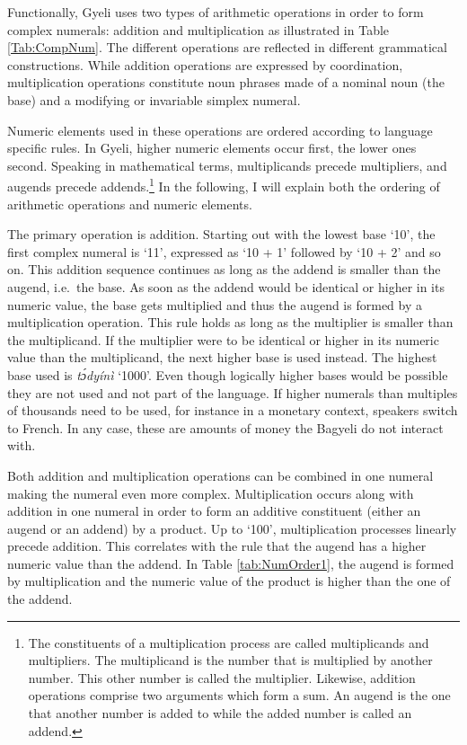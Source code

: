 Functionally, Gyeli uses two types of arithmetic operations in order to form complex numerals: addition and multiplication as illustrated in Table \ref{Tab:CompNum}. The different operations are reflected in different grammatical constructions. While addition operations are expressed by coordination, multiplication operations constitute noun phrases made of a nominal noun (the base) and a modifying or invariable simplex numeral.

Numeric elements used in these operations are ordered according to language specific rules. In Gyeli, higher numeric elements occur first, the lower ones second. Speaking in mathematical terms, multiplicands precede multipliers, and augends precede addends.\footnote{The constituents of a multiplication process are called multiplicands and multipliers. The multiplicand is the number that is multiplied by another number. This other number is called the multiplier. Likewise, addition operations comprise two arguments which form a sum. An augend is the one that another number is added to while the added number is called an addend.} In the following, I will explain both the ordering of arithmetic operations and numeric elements.

The primary operation is addition. Starting out with the lowest base `10', the first complex numeral is `11', expressed as `10 + 1' followed by `10 + 2' and so on. This addition sequence continues as long as the addend is smaller than the augend, i.e.~the base. As soon as the addend would be identical or higher in its numeric value, the base gets multiplied and thus the augend is formed by a multiplication operation. This rule holds as long as the multiplier is smaller than the multiplicand. If the multiplier were to be identical or higher in its numeric value than the multiplicand, the next higher base is used instead. The highest base used is {\itshape tɔ́dyínì} `1000'. Even though logically higher bases would be possible they are not used and not part of the language. If higher numerals than multiples of thousands need to be used, for instance in a monetary context, speakers switch to French. In any case, these are amounts of money the Bagyeli do not interact with.

Both addition and multiplication operations can be combined in one numeral making the numeral even more complex. Multiplication occurs along with addition in one numeral in order to form an additive constituent (either an augend or an addend) by a product. Up to `100', multiplication processes linearly precede addition. This correlates with the rule that the augend has a higher numeric value than the addend. In Table \ref{tab:NumOrder1}, the augend is formed by multiplication and the numeric value of the product is higher than the one of the addend. 

